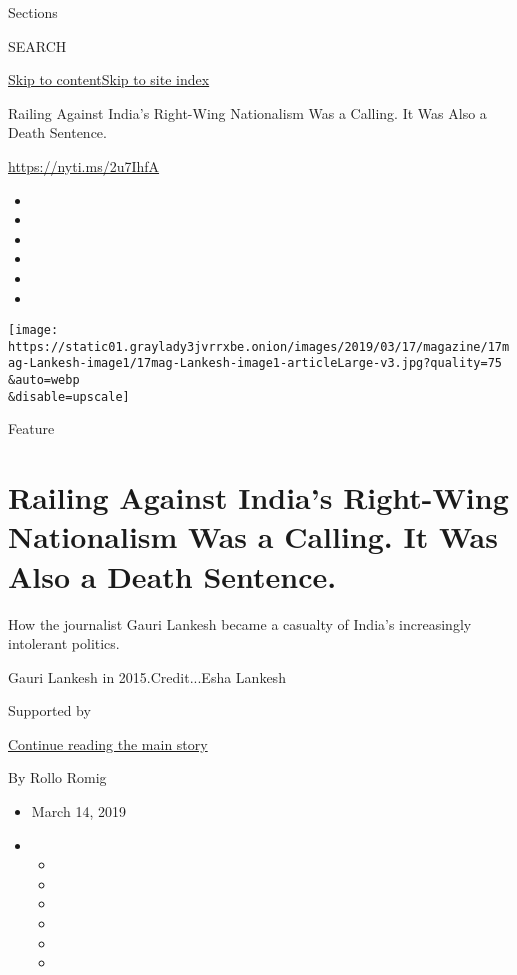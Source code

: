 Sections

SEARCH

\protect\hyperlink{site-content}{Skip to
content}\protect\hyperlink{site-index}{Skip to site index}

Railing Against India's Right-Wing Nationalism Was a Calling. It Was
Also a Death Sentence.

\url{https://nyti.ms/2u7IhfA}

\begin{itemize}
\item
\item
\item
\item
\item
\item
\end{itemize}

\texttt{[image: https://static01.graylady3jvrrxbe.onion/images/2019/03/17/magazine/17mag-Lankesh-image1/17mag-Lankesh-image1-articleLarge-v3.jpg?quality=75\\\&auto=webp\\\&disable=upscale]}

Feature

\hypertarget{railing-against-indias-right-wing-nationalism-was-a-calling-it-was-also-a-death-sentence}{%
\section{Railing Against India's Right-Wing Nationalism Was a Calling.
It Was Also a Death
Sentence.}\label{railing-against-indias-right-wing-nationalism-was-a-calling-it-was-also-a-death-sentence}}

How the journalist Gauri Lankesh became a casualty of India's
increasingly intolerant politics.

Gauri Lankesh in 2015.Credit...Esha Lankesh

Supported by

\protect\hyperlink{after-sponsor}{Continue reading the main story}

By Rollo Romig

\begin{itemize}
\item
  March 14, 2019
\item
  \begin{itemize}
  \item
  \item
  \item
  \item
  \item
  \item
  \end{itemize}
\end{itemize}

